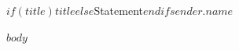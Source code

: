 \documentclass[10pt,a4paper]{article}
\begin{document}
\fontsize{9.5}{14}\selectfont

{\fontsize{12}{16}\selectfont $if(title)$$title$$else$Statement$endif$}\hfill $sender.name$

\vspace{1em}

$body$
\end{document}
